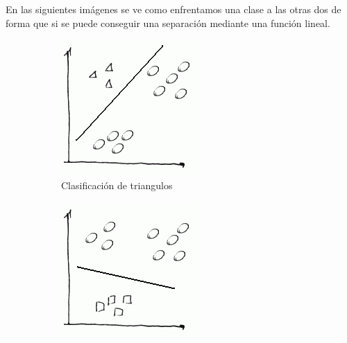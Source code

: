 \documentclass[12pt,a4paper]{article}
\begin{document}
En las siguientes imágenes se ve como enfrentamos una clase a las otras dos de forma que si se puede conseguir una separación mediante una función lineal.



\begin{figure}[H]
	\centering
	\begin{subfigure}[b]{0.3\textwidth}
		\label{f:gato}
		\includegraphics[width=\textwidth]{../imagenesRL/screenshot001}
		\caption[Clasificación de triangulos]{Clasificación de triangulos}	
	\end{subfigure}
	\begin{subfigure}[b]{0.3\textwidth}
		\label{f:tigre}
		\includegraphics[width=\textwidth]{../imagenesRL/screenshot004}

\end{subfigure}
\end{figure}
\end{document}
